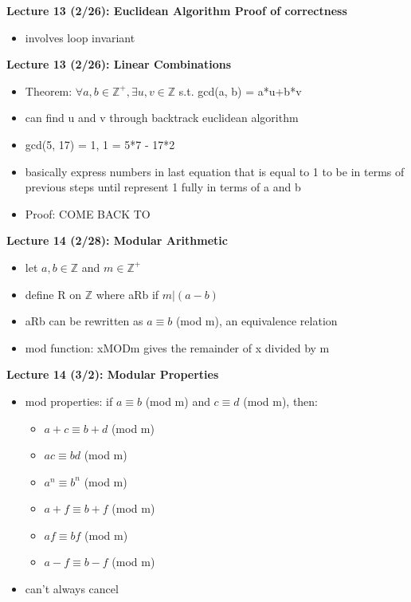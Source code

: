 \documentclass[twocolumn]{article}
\begin{document}
\textbf{Lecture 13 (2/26): Euclidean Algorithm Proof of correctness}
\begin{itemize}
    \item involves loop invariant
\end{itemize}

\textbf{Lecture 13 (2/26): Linear Combinations}
\begin{itemize}
    \item Theorem: $\forall a, b \in \mathbb{Z}^+, \exists u, v \in \mathbb{Z}$ s.t. gcd(a, b) = a*u+b*v
    \item can find u and v through backtrack euclidean algorithm
    \item gcd(5, 17) = 1, 1 = 5*7 - 17*2
    \item basically express numbers in last equation that is equal to 1 to be in terms of previous steps until represent 1 fully in terms of a and b
    \item Proof: COME BACK TO
\end{itemize}

\textbf{Lecture 14 (2/28): Modular Arithmetic}
\begin{itemize}
    \item let $a, b \in \mathbb{Z}$ and $m \in \mathbb{Z}^+$
    \item define R on $\mathbb{Z}$ where aRb if $m|(a-b)$
    \item aRb can be rewritten as $a \equiv b$ (mod m), an equivalence relation
    \item mod function: xMODm gives the remainder of x divided by m
\end{itemize}

\textbf{Lecture 14 (3/2): Modular Properties}
\begin{itemize}
    \item mod properties: if $a \equiv b$ (mod m) and $c \equiv d$ (mod m), then:
    \begin{itemize}
        \item $a+c \equiv b+d$ (mod m)
        \item $ac \equiv bd$ (mod m)
        \item $a^n \equiv b^n$ (mod m)
        \item $a+f \equiv b+f$ (mod m)
        \item $af \equiv bf$ (mod m)
        \item $a-f \equiv b-f$ (mod m)
    \end{itemize}
    \item can't always cancel
\end{itemize}
\end{document}
